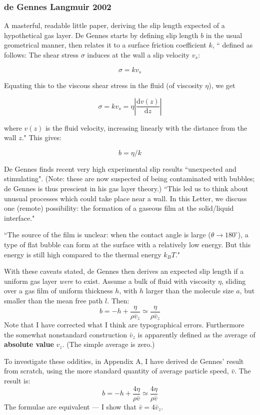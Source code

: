 \documentclass[twocolumn]{article}
\begin{document}
\subsubsection*{de Gennes Langmuir 2002}
A masterful, readable little paper, deriving the slip length expected of a hypothetical gas layer. De Gennes starts by defining slip length $b$ in the usual geometrical manner, then relates it to a surface friction coefficient $k$, `` defined as follows: The shear stress $\sigma$ induces at the wall a slip velocity $v_{s}$:

\[ \sigma = k v_{s} \]

Equating this to the viscous shear stress in the fluid (of viscosity $\eta$), we get

\[ \sigma = k v_{s} = \eta \left| \frac{\mathrm{d} v(z)}{\mathrm{d} z} \right| \]

where $v(z)$ is the fluid velocity, increasing linearly with the distance from the wall $z$." This gives:

\[ b = \eta / k \]

De Gennes finds recent very high experimental slip results ``unexpected and stimulating". (Note: these are now suspected of being contaminated with bubbles; de Gennes is thus prescient in his gas layer theory.) ``This led us to think about unusual processes which could take place near a wall. In this Letter, we discuss one (remote) possibility: the formation of a gaseous film at the solid/liquid interface."

``The source of the film is unclear: when the contact angle is large ($\theta \rightarrow 180^{\circ}$), a type of flat bubble can form at the surface with a relatively low energy.  But this energy is still high compared to the thermal energy $k_{B}T  $."


With these caveats stated, de Gennes then derives an expected slip length if a uniform gas layer \emph{were} to exist. Assume a bulk of fluid with viscosity $\eta$, sliding over a gas film of uniform thickness $h$, with $h$ larger than the molecule size $a$, but smaller than the mean free path $l$.
Then:
\[ b = -h + \frac{\eta}{\rho \bar{v}_{z}} \simeq \frac{\eta}{\rho \bar{v}_{z}} \]
Note that I have corrected what I think are typographical errors.  Furthermore the somewhat nonstandard construction $\bar{v}_{z}$ is apparently defined as the average of \textbf{absolute value} $v_{z}$.  (The simple average is zero.)

To investigate these oddities, in Appendix A, I have derived de Gennes' result from scratch, using the more standard quantity of average particle speed, $\bar{v}$.  The result is:
\[ b = -h + \frac{4 \eta}{\rho \bar{v}} \simeq \frac{4 \eta}{\rho \bar{v}} \]
The formulae are equivalent --- I show that $\bar{v}=4\bar{v}_{z}$.
\end{document}
